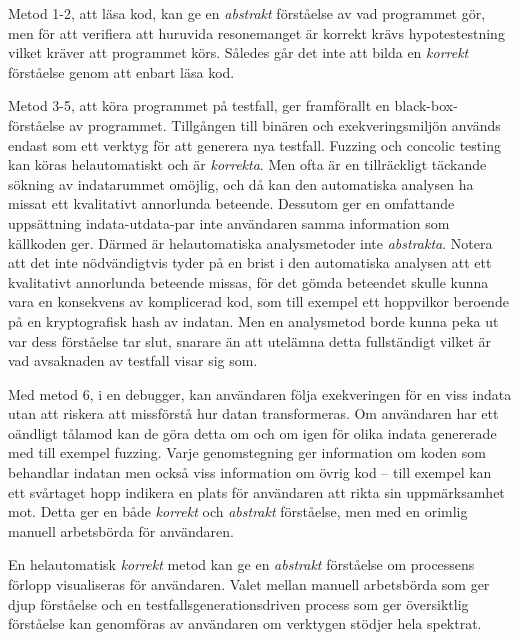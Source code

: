 Metod 1-2, att läsa kod, kan ge en \textit{abstrakt} förståelse av vad programmet gör, men för
att verifiera att huruvida resonemanget är korrekt krävs hypotestestning vilket
kräver att programmet körs. Således går det inte att bilda en \textit{korrekt} förståelse genom 
att enbart läsa kod.

Metod 3-5, att köra programmet på testfall, ger framförallt en black-box-förståelse av
programmet. Tillgången till binären och exekveringsmiljön används endast som ett verktyg
för att generera nya testfall. Fuzzing och concolic testing kan köras helautomatiskt och är
\textit{korrekta}. Men ofta är en tillräckligt täckande sökning av indatarummet omöjlig, och då kan
den automatiska analysen ha missat ett kvalitativt annorlunda beteende. Dessutom ger en omfattande
uppsättning indata-utdata-par inte användaren samma information som källkoden ger. Därmed är
helautomatiska analysmetoder inte \textit{abstrakta}. Notera att det inte nödvändigtvis tyder på en
brist i den automatiska analysen att ett kvalitativt annorlunda beteende missas, för det gömda
beteendet skulle kunna vara en konsekvens av komplicerad kod, som till exempel ett hoppvilkor
beroende på en kryptografisk hash av indatan. Men en analysmetod borde kunna peka ut var dess
förståelse tar slut, snarare än att utelämna detta fullständigt vilket är vad avsaknaden av testfall
visar sig som.

Med metod 6, i en debugger, kan användaren följa exekveringen för en viss indata utan att riskera
att missförstå hur datan transformeras. Om användaren har ett oändligt tålamod kan de göra detta om
och om igen för olika indata genererade med till exempel fuzzing. Varje genomstegning ger
information om koden som behandlar indatan men också viss information om övrig kod -- till exempel
kan ett svårtaget hopp indikera en plats för användaren att rikta sin uppmärksamhet mot. Detta ger
en både \textit{korrekt} och \textit{abstrakt} förståelse, men med en orimlig manuell arbetsbörda
för användaren.

En helautomatisk \textit{korrekt} metod kan ge en \textit{abstrakt} förståelse om processens förlopp
visualiseras för användaren. Valet mellan manuell arbetsbörda som ger djup förståelse och en
testfallsgenerationsdriven process som ger översiktlig förståelse kan genomföras av användaren om
verktygen stödjer hela spektrat.

